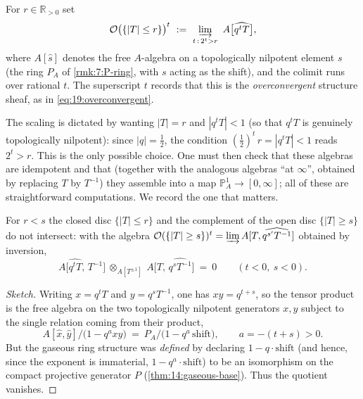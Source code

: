 \begin{definition}
\label{def:21:overconvergent-disc}
For $r\in\mathbb R_{>0}$ set
\begin{equation*}
\mathcal O\bigl(\{|T|\le r\}\bigr)^{t}\ :=\
\varinjlim_{t\,:\,2^{t}>r}\ A\bigl[\widehat{q^{t}T}\bigr],
\end{equation*}
where $A[\widehat{s}]$ denotes the free $A$-algebra on a topologically nilpotent
element $s$ (the ring $P_A$ of \cref{rmk:7:P-ring}, with $s$ acting as the shift),
and the colimit runs over rational $t$. The superscript $t$ records that this is
the \emph{overconvergent} structure sheaf, as in \cref{eq:19:overconvergent}.
\end{definition}

The scaling is dictated by wanting $|T|=r$ and $|q^{t}T|<1$ (so that $q^{t}T$ is
genuinely topologically nilpotent): since $|q|=\tfrac12$, the condition
$(\tfrac12)^{t}\,r=|q^{t}T|<1$ reads $2^{t}>r$. This is the only possible choice.
One must then check that these algebras are idempotent and that (together with
the analogous algebras ``at $\infty$'', obtained by replacing $T$ by $T^{-1}$)
they assemble into a map $\mathbb P^1_A\to[0,\infty]$; all of these are
straightforward computations. We record the one that matters.

\begin{proposition}
\label{prop:21:disjoint-discs}
For $r<s$ the closed disc $\{|T|\le r\}$ and the complement of the open disc
$\{|T|\ge s\}$ do not intersect: with the algebra
$\mathcal O(\{|T|\ge s\})^{t}=\varinjlim A[T,\widehat{q^{s'}T^{-1}}]$ obtained by
inversion,
\begin{equation*}
A\bigl[\widehat{q^{t}T},\,T^{-1}\bigr]\ \otimes_{A[T^{\pm1}]}\
A\bigl[T,\,\widehat{q^{s}T^{-1}}\bigr]\ =\ 0
\qquad(t<0,\ s<0).
\end{equation*}
\end{proposition}

\begin{proof}[Sketch]
Writing $x=q^{t}T$ and $y=q^{s}T^{-1}$, one has $xy=q^{t+s}$, so the tensor
product is the free algebra on the two topologically nilpotent generators
$x,y$ subject to the single relation coming from their product,
\begin{equation*}
A[\widehat x,\widehat y]\big/\bigl(1-q^{a}xy\bigr)\ =\ P_A\big/\bigl(1-q^{a}\,\mathrm{shift}\bigr),
\qquad a=-(t+s)>0 .
\end{equation*}
But the gaseous ring structure was \emph{defined} by declaring
$1-q\cdot\mathrm{shift}$ (and hence, since the exponent is immaterial,
$1-q^{a}\cdot\mathrm{shift}$) to be an isomorphism on the compact projective
generator $P$ (\cref{thm:14:gaseous-base}). Thus the quotient vanishes.
\end{proof}

